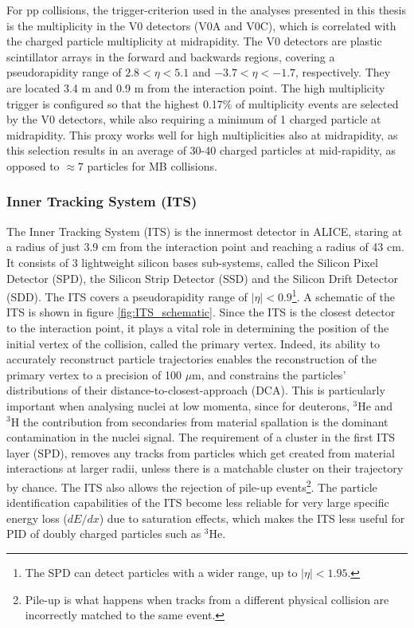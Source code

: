 For pp collisions, the trigger-criterion used in the analyses presented in this thesis is the multiplicity in the V0 detectors (V0A and V0C), which is correlated with the charged particle multiplicity at midrapidity. The V0 detectors are plastic scintillator arrays in the forward and backwards regions, covering a pseudorapidity range of $2.8<\eta<5.1$ and $-3.7<\eta<-1.7$, respectively. They are located 3.4 m and 0.9 m from the interaction point. The high multiplicity trigger is configured so that the highest 0.17\% of multiplicity events are selected by the V0 detectors, while also requiring a minimum of 1 charged particle at midrapidity. This proxy works well for high multiplicities also at midrapidity, as this selection results in an average of 30-40 charged particles at mid-rapidity, as opposed to $\approx7$ particles for MB collisions. 

\subsubsection{Inner Tracking System (ITS)}
The Inner Tracking System (ITS) is the innermost detector in ALICE, staring at a radius of just 3.9 cm from the interaction point and reaching a radius of 43 cm. It consists of 3 lightweight silicon bases sub-systems, called the Silicon Pixel Detector (SPD), the Silicon Strip Detector (SSD) and the Silicon Drift Detector (SDD). The ITS covers a pseudorapidity range of $|\eta|<0.9$\footnote{The SPD can detect particles with a wider range, up to $|\eta|<1.95$.}. A schematic of the ITS is shown in figure \ref{fig:ITS_schematic}. Since the ITS is the closest detector to the interaction point, it plays a vital role in determining the position of the initial vertex of the collision, called the primary vertex. Indeed, its ability to accurately reconstruct particle trajectories enables the reconstruction of the primary vertex to a precision of 100 $\mu$m, and constrains the particles' distributions of their distance-to-closest-approach (DCA). This is particularly important when analysing nuclei at low momenta, since for deuterons, $^3\mathrm{He}$ and $^3\mathrm{H}$ the contribution from secondaries from material spallation is the dominant contamination in the nuclei signal. The requirement of a cluster in the first ITS layer (SPD), removes any tracks from particles which get created from material interactions at larger radii, unless there is a matchable cluster on their trajectory by chance. The ITS also allows the rejection of pile-up events\footnote{Pile-up is what happens when tracks from a different physical collision are incorrectly matched to the same event.}. The particle identification capabilities of the ITS become less reliable for very large specific energy loss ($dE/dx$) due to saturation effects, which makes the ITS less useful for PID of doubly charged particles such as $^3\mathrm{He}$.


